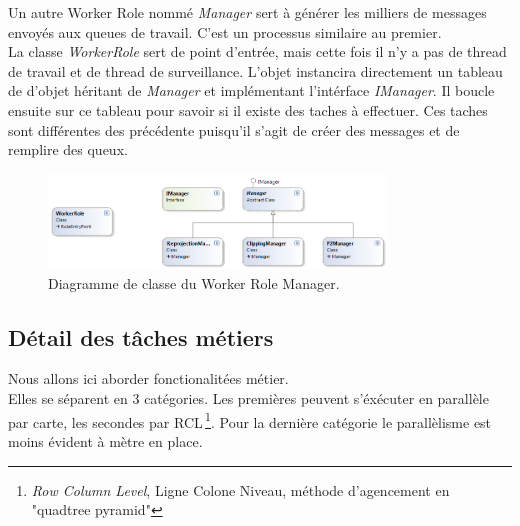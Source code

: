Un autre Worker Role nommé \textit{Manager} sert à générer les
milliers de messages envoyés aux queues de travail. C'est un processus
similaire au premier. \\

La classe \textit{WorkerRole} sert de point d'entrée, mais cette fois
il n'y a pas de thread de travail et de thread de
surveillance. L'objet instancira directement un tableau de d'objet
héritant de \textit{Manager} et implémentant l'intérface
\textit{IManager}. Il boucle ensuite sur ce tableau pour savoir si il
existe des taches à effectuer. Ces taches sont différentes des
précédente puisqu'il s'agit de créer des messages et de remplire des
queux.

\begin{figure}[h!]
  \caption{Diagramme de classe du Worker Role Manager.}
  \centering
    \includegraphics[width=0.8\textwidth]{images/Manager.png}
\end{figure}









%
%

\subsection{Détail des tâches métiers}
Nous allons ici aborder fonctionalitées métier. \\ Elles se séparent
en 3 catégories. Les premières peuvent s'éxécuter en parallèle par
carte, les secondes par RCL\,\footnote{\textit{Row Column Level},
  Ligne Colone Niveau, méthode d'agencement en "quadtree
  pyramid"}. Pour la dernière catégorie le parallèlisme est moins
évident à mètre en place. \\


